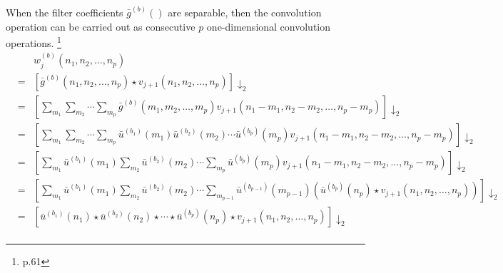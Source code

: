 When the filter coefficients $\bar{g}^{(b)}()$ are separable, 
then the convolution operation can be carried out as consecutive
$p$ one-dimensional convolution operations.
\footnote{\cite{mallat} p.61}
   \begin{eqnarray*}
      &&w_j^{(b)}(n_1, n_2, \ldots, n_p) \\
         &=& \left[
             \bar{g}^{(b)}(n_1, n_2, \ldots, n_p) \star v_{j+1}(n_1, n_2, \ldots, n_p) 
             \right]\downarrow_2 \\
         &=& \left[
             \sum\limits_{m_1} \sum\limits_{m_2} \cdots \sum\limits_{m_p} 
             \bar{g}^{(b)}(m_1, m_2, \ldots, m_p) v_{j+1}(n_1-m_1, n_2-m_2, \ldots, n_p-m_p)
             \right]\downarrow_2 \\
         &=& \left[
             \sum\limits_{m_1} \sum\limits_{m_2} \cdots \sum\limits_{m_p} 
             \bar{u}^{(b_1)}(m_1) 
             \bar{u}^{(b_2)}(m_2)
             \cdots 
             \bar{u}^{(b_p)}(m_p)
             v_{j+1}(n_1-m_1, n_2-m_2, \ldots, n_p-m_p)
             \right]\downarrow_2 \\
         &=& \left[
             \sum\limits_{m_1} \bar{u}^{(b_1)}(m_1) 
             \sum\limits_{m_2} \bar{u}^{(b_2)}(m_2) 
             \cdots 
             \sum\limits_{m_p} \bar{u}^{(b_p)}(m_p) 
             v_{j+1}(n_1-m_1, n_2-m_2, \ldots, n_p-m_p)
             \right]\downarrow_2 \\
         &=& \left[
             \sum\limits_{m_1} \bar{u}^{(b_1)}(m_1) 
             \sum\limits_{m_2} \bar{u}^{(b_2)}(m_2) 
             \cdots 
             \sum\limits_{m_{p-1}} \bar{u}^{(b_{p-1})}(m_{p-1}) 
             \left(\bar{u}^{(b_p)}(n_p) \star v_{j+1}(n_1, n_2, \ldots, n_p)\right)
             \right]\downarrow_2 \\
         &=& \left[
             \bar{u}^{(b_1)}(n_1) 
             \star
             \bar{u}^{(b_2)}(n_2) 
             \star
             \cdots 
             \star
             \bar{u}^{(b_p)}(n_p) \star 
             v_{j+1}(n_1, n_2, \ldots, n_p)
             \right]\downarrow_2 \\
   \end{eqnarray*}


